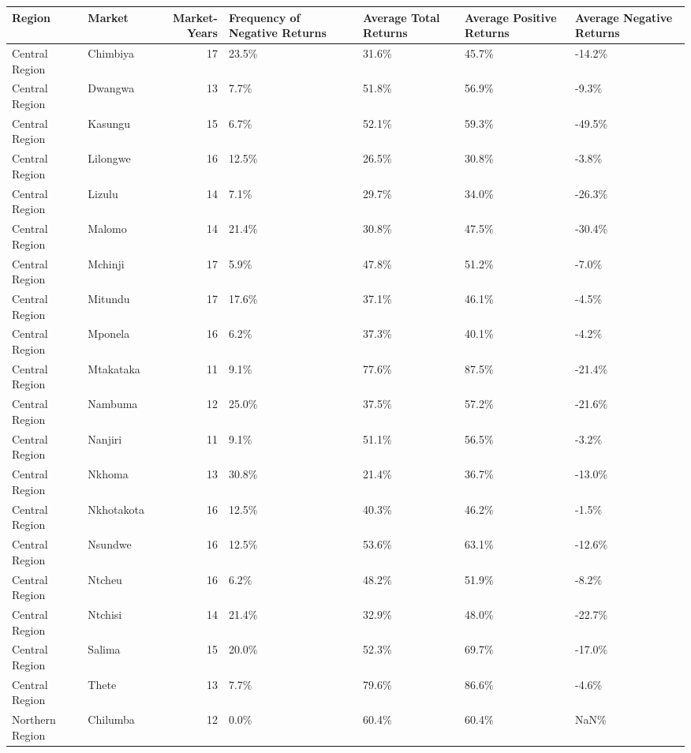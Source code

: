 \begin{table}[ht]
\centering
\begin{tabular}{llrllll}
  \hline
Region & Market & Market-Years & Frequency of Negative Returns & Average Total Returns & Average Positive Returns & Average Negative Returns \\ 
  \hline
Central Region & Chimbiya &  17 & 23.5\% & 31.6\% & 45.7\% & -14.2\% \\ 
  Central Region & Dwangwa &  13 & 7.7\% & 51.8\% & 56.9\% & -9.3\% \\ 
  Central Region & Kasungu &  15 & 6.7\% & 52.1\% & 59.3\% & -49.5\% \\ 
  Central Region & Lilongwe &  16 & 12.5\% & 26.5\% & 30.8\% & -3.8\% \\ 
  Central Region & Lizulu &  14 & 7.1\% & 29.7\% & 34.0\% & -26.3\% \\ 
  Central Region & Malomo &  14 & 21.4\% & 30.8\% & 47.5\% & -30.4\% \\ 
  Central Region & Mchinji &  17 & 5.9\% & 47.8\% & 51.2\% & -7.0\% \\ 
  Central Region & Mitundu &  17 & 17.6\% & 37.1\% & 46.1\% & -4.5\% \\ 
  Central Region & Mponela &  16 & 6.2\% & 37.3\% & 40.1\% & -4.2\% \\ 
  Central Region & Mtakataka &  11 & 9.1\% & 77.6\% & 87.5\% & -21.4\% \\ 
  Central Region & Nambuma &  12 & 25.0\% & 37.5\% & 57.2\% & -21.6\% \\ 
  Central Region & Nanjiri &  11 & 9.1\% & 51.1\% & 56.5\% & -3.2\% \\ 
  Central Region & Nkhoma &  13 & 30.8\% & 21.4\% & 36.7\% & -13.0\% \\ 
  Central Region & Nkhotakota &  16 & 12.5\% & 40.3\% & 46.2\% & -1.5\% \\ 
  Central Region & Nsundwe &  16 & 12.5\% & 53.6\% & 63.1\% & -12.6\% \\ 
  Central Region & Ntcheu &  16 & 6.2\% & 48.2\% & 51.9\% & -8.2\% \\ 
  Central Region & Ntchisi &  14 & 21.4\% & 32.9\% & 48.0\% & -22.7\% \\ 
  Central Region & Salima &  15 & 20.0\% & 52.3\% & 69.7\% & -17.0\% \\ 
  Central Region & Thete &  13 & 7.7\% & 79.6\% & 86.6\% & -4.6\% \\ 
  Northern Region & Chilumba &  12 & 0.0\% & 60.4\% & 60.4\% & NaN\% \\ 

\end{tabular}
\end{table}
